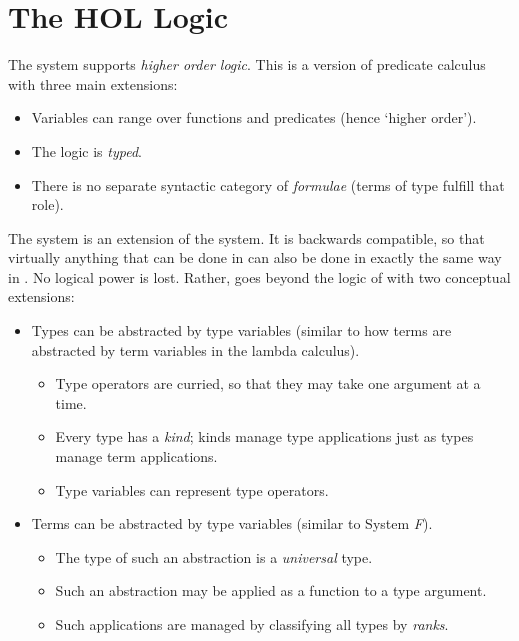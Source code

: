 \chapter{The HOL Logic}\label{HOLlogic}

The \HOL{}  system  supports {\it  higher order  logic}.   This is a version of
predicate calculus with three main extensions:

\begin{itemize}
\item Variables can range over functions and predicates
(hence `higher order').
\item The logic is {\it typed}.
\item There is no separate syntactic category of {\it formulae\/}
(terms of type  fulfill that role).
\end{itemize}

The \HOLW{} system is an extension of the \HOL{} system.  It is backwards
compatible, so that virtually anything that can be done in \HOL{}
can also be done in exactly the same way in \HOLW.  No logical power is lost.
Rather, \HOLW{} goes beyond the logic of \HOL{} with two conceptual
extensions:

\begin{itemize}
\item Types can be abstracted by type variables
(similar to how terms are abstracted by term variables in the lambda calculus).
 \begin{itemize}
 \item Type operators are curried,
       so that they may take one argument at a time.
 \item Every type has a {\it kind}; kinds manage type applications
       just as types manage term applications.
 \item Type variables can represent type operators.
 \end{itemize}
\item Terms can be abstracted by type variables
(similar to System {\it F}).
 \begin{itemize}
 \item The type of such an abstraction is a {\it universal\/} type.
 \item Such an abstraction may be applied
       as a function to a type argument.
 \item Such applications are managed
       by classifying all types by {\it ranks}.
 \end{itemize}
\end{itemize}

